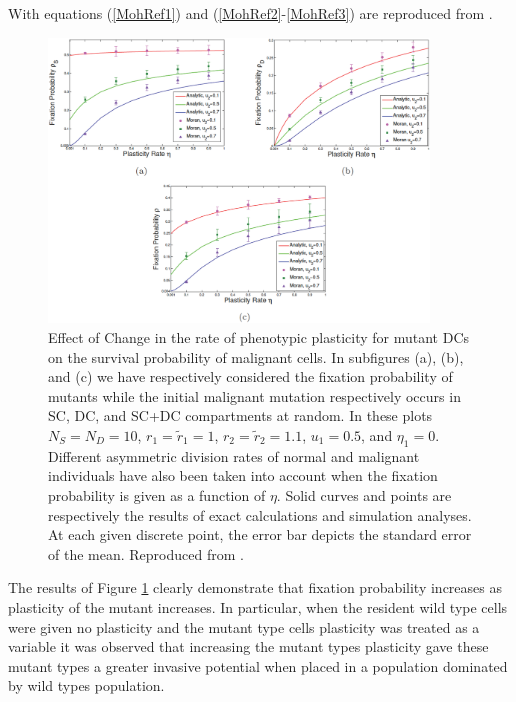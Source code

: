 \documentclass[12pt]{article}
\begin{document}
With equations (\ref{MohRef1}) and (\ref{MohRef2}-\ref{MohRef3}) are reproduced from \cite{mohammad}.

\begin{figure}[!ht]
\begin{center}
\includegraphics[width=0.9\textwidth]{moh_fig5.png}
\end{center}
\caption{Effect of Change in the rate of phenotypic plasticity for mutant DCs on the survival probability of malignant cells. In subfigures (a), (b), and (c) we have respectively considered the fixation probability of mutants while the initial malignant mutation respectively occurs in SC, DC, and SC+DC compartments at random. In these plots $N_S=N_D=10$, $r_1=\tilde{r}_1=1$, $r_2=\tilde{r}_2=1.1$, $u_1=0.5$, and $\eta_1=0$. Different asymmetric division rates of normal and malignant individuals have also been taken into account when the fixation probability is given as a function of $\eta$. Solid curves and points are respectively the results of exact calculations and simulation analyses. At each given discrete point, the error bar depicts the standard error of the mean. Reproduced from \cite{mohammad}.}\label{MohFig5}
\end{figure}

The results of Figure \ref{MohFig5} clearly demonstrate that fixation probability increases as plasticity of the mutant increases. In particular, when the resident wild type cells were given no plasticity and the mutant type cells plasticity was treated as a variable it was observed that increasing the mutant types plasticity gave these mutant types a greater invasive potential when placed in a population dominated by wild types population.
\end{document}
